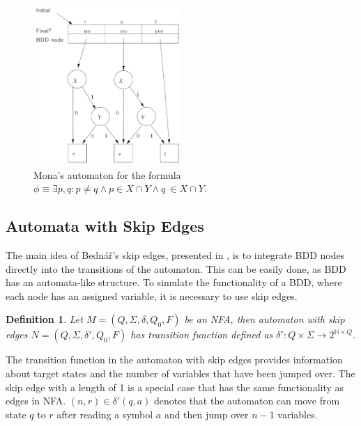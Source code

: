 \documentclass[pdflatex,sn-mathphys-num]{sn-jnl}%
\theoremstyle{thmstyleone}%
\theoremstyle{thmstyletwo}%
\theoremstyle{thmstylethree}%
\newtheorem{definition}{Definition}%
\begin{document}
        \begin{figure}[h]
            \centering
            \includegraphics[width=0.5\textwidth]{Figures/mona_aut.png}
            \vspace*{0.5em}
            \caption{Mona's automaton for the formula $\phi \equiv \exists p, q : p \neq q \land p \in X \cap Y \land q \ \in X \cap Y$.}
            \label{fig:mona}
        \end{figure}

        \vspace*{-2em}

    \subsection{Automata with Skip Edges}
        The main idea of Bednář's skip edges, presented in \cite{Bednar}, is to integrate BDD nodes directly into the transitions of the automaton. This can be easily done, as BDD has an automata-like structure. To simulate the functionality of a BDD, where each node has an assigned variable, it is necessary to use skip edges.

        \vspace*{0.5em}

        \begin{definition}
            Let $M = (Q, \Sigma, \delta, Q_0, F)$ be an NFA, then automaton with skip edges $N = (Q, \Sigma, \delta', Q_0, F)$ has transition function defined as $\delta' : Q \times \Sigma \rightarrow 2^{\mathbb{N} \times Q}$.
        \end{definition}

        \vspace*{0.5em}

        The transition function in the automaton with skip edges provides information about target states and the number of variables that have been jumped over. The skip edge with a length of 1 is a special case that has the same functionality as edges in NFA. $(n, r) \in \delta'(q, a)$ denotes that the automaton can move from state $q$ to $r$ after reading a symbol $a$ and then jump over $n-1$ variables.
\end{document}
